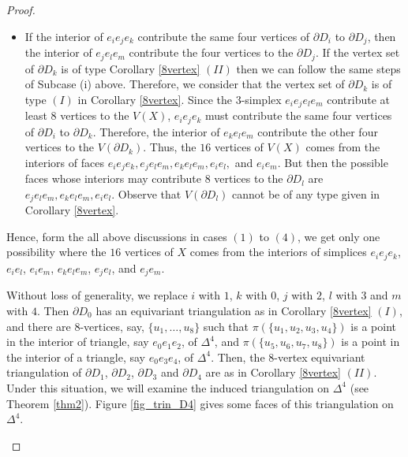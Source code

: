 \documentclass[10pt,a4paper]{amsart}
\begin{document}
\begin{proof}
\begin{itemize}
    \item If the interior of $e_ie_je_k$ contribute the same four vertices of $\partial D_i$ to $\partial D_j$, then the interior of $e_je_le_m$ contribute the four vertices to the $\partial D_j$. If  the vertex set of $\partial D_k$ is of type Corollary \ref{8vertex} $(II)$ then we can follow the same steps of Subcase (i) above. Therefore, we consider that  the vertex set of $\partial D_k$ is of type $(I)$ in Corollary \ref{8vertex}. Since the $3$-simplex $e_ie_je_le_m$ contribute at least $8$ vertices to the $V(X)$, $e_ie_je_k$ must contribute the same four vertices of $\partial D_i$ to $\partial D_k$. Therefore, the interior of $e_ke_le_m$ contribute the other four vertices to the $V(\partial D_k)$. Thus, the $16$ vertices of $V(X)$ comes from the interiors of faces $e_ie_je_k,e_je_le_m,e_ke_le_m,e_ie_l,$ and $e_ie_m$.   
But then the possible faces whose interiors may contribute $8$ vertices to the $\partial D_l$ are $e_je_le_m, e_ke_le_m, e_ie_l $. Observe that $V(\partial D_l)$ cannot be of any type given in Corollary \ref{8vertex}.
\end{itemize}



Hence, form the all above discussions in cases $(1)$ to $(4)$, we get only one possibility where the $16$ vertices of $X$ comes from the interiors of simplices $e_ie_je_k$, $e_ie_l$, $e_ie_m$, $e_ke_le_m$, $e_je_l$, and  $e_je_m$. 

Without loss of generality, we replace $i $ with $1$, $k$ with $0$, $j$ with $2$, $l$ with $3$ and $m$ with $4$. 
Then $\partial D_0$ has an equivariant triangulation as in  Corollary \ref{8vertex} $(I)$, and there are $8$-vertices, say, $\{u_1, \ldots, u_8\}$ such that $\pi(\{u_1, u_2, u_3, u_4\})$ is a point in the interior of triangle, say $e_0e_1e_2$, of $\Delta^4$, and $\pi(\{u_5, u_6, u_7, u_8\})$ is a point in the interior of a triangle, say $e_0e_3e_4$, of $\Delta^4$. Then, the 8-vertex equivariant triangulation of $\partial D_1$, $\partial D_2$, $\partial D_3$ and  $\partial D_4$ are as in Corollary \ref{8vertex} $(II)$. Under this situation, we will examine the induced triangulation on $\Delta^4$ (see Theorem \ref{thm2}). Figure \ref{fig_trin_D4} gives some faces of this triangulation on $\Delta^4$.
\begin{figure}
\end{figure}
\end{proof}
\end{document}
